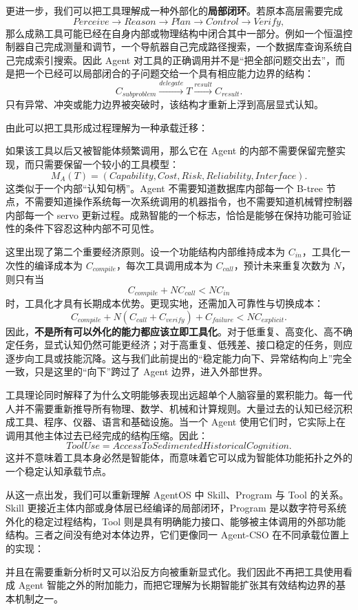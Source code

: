 更进一步，我们可以把工具理解成一种外部化的\textbf{局部闭环}。若原本高层需要完成
\[
Perceive
\rightarrow
Reason
\rightarrow
Plan
\rightarrow
Control
\rightarrow
Verify,
\]
那么成熟工具可能已经在自身内部或物理结构中闭合其中一部分。例如一个恒温控制器自己完成测量和调节，一个导航器自己完成路径搜索，一个数据库查询系统自己完成索引搜索。因此 Agent 对工具的正确调用并不是``把全部问题交出去''，而是把一个已经可以局部闭合的子问题交给一个具有相应能力边界的结构：
\[
C_{subproblem}
\xrightarrow{delegate}
T
\xrightarrow{result}
C_{result}.
\]
只有异常、冲突或能力边界被突破时，该结构才重新上浮到高层显式认知。

由此可以把工具形成过程理解为一种承载迁移：
\begin{statementbox}
\centering
{}
\end{statementbox}
如果该工具以后又被智能体频繁调用，那么它在 Agent 的内部不需要保留完整实现，而只需要保留一个较小的工具模型：
\[
M_A(T)
=
(
Capability,
Cost,
Risk,
Reliability,
Interface
).
\]
这类似于一个内部``认知句柄''。Agent 不需要知道数据库内部每一个 B-tree 节点，不需要知道操作系统每一次系统调用的机器指令，也不需要知道机械臂控制器内部每一个 servo 更新过程。成熟智能的一个标志，恰恰是能够在保持功能可验证性的条件下容忍这种内部不可见性。

这里出现了第二个重要经济原则。设一个功能结构内部维持成本为 $C_{in}$，工具化一次性的编译成本为 $C_{compile}$，每次工具调用成本为 $C_{call}$，预计未来重复次数为 $N$，则只有当
\[
C_{compile}
+
N C_{call}
<
N C_{in}
\]
时，工具化才具有长期成本优势。更现实地，还需加入可靠性与切换成本：
\[
C_{compile}
+
N(C_{call}+C_{verify})
+
C_{failure}
<
N C_{explicit}.
\]
因此，\textbf{不是所有可以外化的能力都应该立即工具化}。对于低重复、高变化、高不确定任务，显式认知仍然可能更经济；对于高重复、低残差、接口稳定的任务，则应逐步向工具或技能沉降。这与我们此前提出的``稳定能力向下、异常结构向上''完全一致，只是这里的``向下''跨过了 Agent 边界，进入外部世界。

工具理论同时解释了为什么文明能够表现出远超单个人脑容量的累积能力。每一代人并不需要重新推导所有物理、数学、机械和计算规则。大量过去的认知已经沉积成工具、程序、仪器、语言和基础设施。当一个 Agent 使用它们时，它实际上在调用其他主体过去已经完成的结构压缩。因此：
\[
\boxed{
ToolUse
=
AccessToSedimentedHistoricalCognition.
}
\]
这并不意味着工具本身必然是智能体，而意味着它可以成为智能体功能拓扑之外的一个稳定认知承载节点。

从这一点出发，我们可以重新理解 AgentOS 中 Skill、Program 与 Tool 的关系。Skill 更接近主体内部或身体层已经编译的局部闭环，Program 是以数字符号系统外化的稳定过程结构，Tool 则是具有明确能力接口、能够被主体调用的外部功能结构。三者之间没有绝对本体边界，它们更像同一 Agent-CSO 在不同承载位置上的实现：
\begin{statementbox}
\centering
{}
\end{statementbox}
并且在需要重新分析时又可以沿反方向被重新显式化。我们因此不再把工具使用看成 Agent 智能之外的附加能力，而把它理解为长期智能扩张其有效结构边界的基本机制之一。

